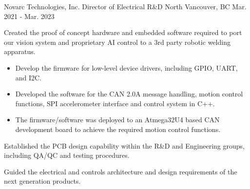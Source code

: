 \begin{cventries}
    \cventry
    {Novarc Technologies, Inc.} %
    {Director of Electrical R\&D} %
    {North Vancouver, BC} %
    {Mar. 2021 - Mar. 2023} %
    { %
        \begin{cvitems}
            \item {Created the proof of concept hardware and embedded software required to port our vision system and proprietary AI control to a 3rd party robotic
                        welding apparatus.}
            \begin{itemize}
                \item {Develop the firmware for low-level device drivers, including GPIO, UART, and I2C.}
                \item {Developed the software for the CAN 2.0A message handling, motion control functions, SPI accelerometer interface and control system in C++.}
                \item {The firmware/software was deployed to an Atmega32U4 based CAN development board to achieve the required motion control functions.}
            \end{itemize}
            \item {Established the PCB design capability within the R\&D and Engineering groups, including QA/QC and testing procedures.}
            \item {Guided the electrical and controls architecture and design requirements of the next generation products.}
        \end{cvitems}
        \vspace{3mm}
        \vspace{1mm}
    }




\end{cventries}

